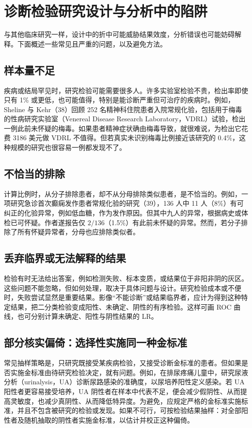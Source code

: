 \section{诊断检验研究设计与分析中的陷阱}
与其他临床研究一样，设计中的折中可能威胁结果效度，分析错误也可能妨碍解释。下面概述一些常见且严重的问题，以及避免方法。

\subsection{样本量不足}
疾病或结局罕见时，研究检验可能需要很多人。许多实验室检验不贵，检出率即使只有 1\% 或更低，也可能值得，特别是能诊断严重但可治疗的疾病时。例如，Sheline 与 Kehr（38）回顾 252 名精神科住院患者入院常规化验，包括用于梅毒的性病研究实验室（Venereal Disease Research Laboratory，VDRL）试验，检出一例此前未怀疑的梅毒。如果患者精神症状确由梅毒导致，就很难说，为检出它花费 3186 美元做 VDRL 不值得。但若真实未识别梅毒比例接近该研究的 0.4\%，这种规模的研究也很容易一例都发现不了。

\subsection{不恰当的排除}
计算比例时，从分子排除患者，却不从分母排除类似患者，是不恰当的。例如，一项研究急诊首次癫痫发作患者常规化验的研究（39），136 人中 11 人（8\%）有可纠正的化验异常，例如低血糖，作为发作原因。但其中九人的异常，根据病史或体检已可怀疑。作者遂报告仅 $2/136$（1.5\%）有此前未怀疑的异常。然而，若分子排除了所有怀疑异常者，分母也应排除类似者。

\subsection{丢弃临界或无法解释的结果}
检验有时无法给出答案，例如检测失败、标本变质，或结果位于非阳非阴的灰区。这些问题不能忽略，但如何处理，取决于具体问题与设计。研究检验成本或不便时，失败尝试显然是重要结果。影像“不能诊断”或结果临界者，应计为得到这种特定结果，把二分类检验变成阳性、未确定、阴性的有序检验。这样可画 ROC 曲线，也可分别计算未确定、阳性与阴性结果的 LR。

\subsection{部分核实偏倚：选择性实施同一种金标准}
常见抽样策略是，只研究既接受某疾病检验，又接受诊断金标准的患者。但如果是否实施金标准由待研究检验决定，就有问题。例如，在排尿疼痛儿童中，研究尿液分析（urinalysis，UA）诊断尿路感染的准确度，以尿培养阳性定义感染。若 UA 阳性者更容易接受培养，UA 阴性者在样本中代表不足，便会减少假阴性、从而提高灵敏度，也减少真阴性、从而降低特异度。为避免，应规定严格的金标准实施标准，并且不包含被研究的检验或发现。如果不可行，可按检验结果抽样：对全部阳性者及随机抽取的阴性者实施金标准，以估计并校正这种偏倚。

